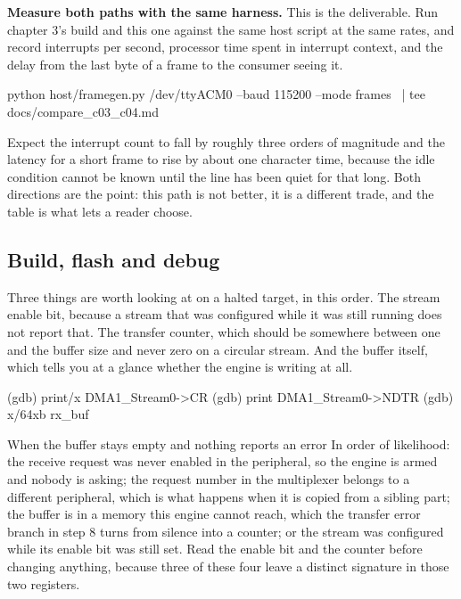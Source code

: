 \begin{steps}
\item \textbf{Measure both paths with the same harness.} This is the
deliverable. Run chapter 3's build and this one against the same host script at
the same rates, and record interrupts per second, processor time spent in
interrupt context, and the delay from the last byte of a frame to the consumer
seeing it.
\begin{shellcode}
python host/framegen.py /dev/ttyACM0 --baud 115200 --mode frames \
  | tee docs/compare_c03_c04.md
\end{shellcode}
Expect the interrupt count to fall by roughly three orders of magnitude and the
latency for a short frame to rise by about one character time, because the idle
condition cannot be known until the line has been quiet for that long. Both
directions are the point: this path is not better, it is a different trade, and
the table is what lets a reader choose.
\end{steps}

\subsection*{Build, flash and debug}



Three things are worth looking at on a halted target, in this order. The stream
enable bit, because a stream that was configured while it was still running does
not report that. The transfer counter, which should be somewhere between one and
the buffer size and never zero on a circular stream. And the buffer itself,
which tells you at a glance whether the engine is writing at all.

\begin{shellcode}
(gdb) print/x DMA1_Stream0->CR
(gdb) print DMA1_Stream0->NDTR
(gdb) x/64xb rx_buf
\end{shellcode}

\begin{note}{When the buffer stays empty and nothing reports an error}
In order of likelihood: the receive request was never enabled in the peripheral,
so the engine is armed and nobody is asking; the request number in the
multiplexer belongs to a different peripheral, which is what happens when it is
copied from a sibling part; the buffer is in a memory this engine cannot reach,
which the transfer error branch in step 8 turns from silence into a counter; or
the stream was configured while its enable bit was still set. Read the enable
bit and the counter before changing anything, because three of these four leave
a distinct signature in those two registers.
\end{note}

